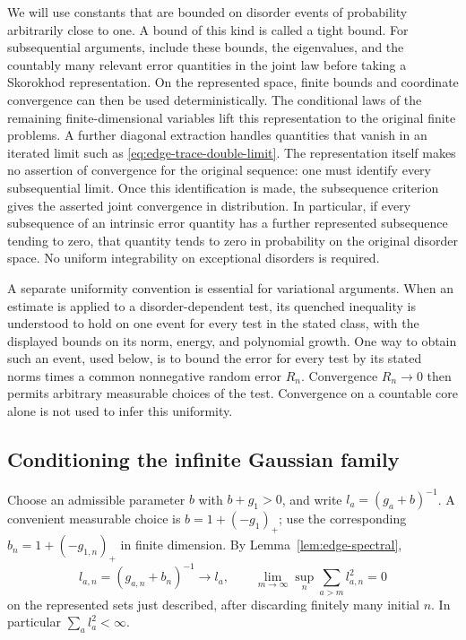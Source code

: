 \begin{remark}
\label{rem:edge-tight-convergence}
We will use constants that are bounded on disorder events of probability
arbitrarily close to one.  A bound of this kind is called a tight bound.
For subsequential arguments, include these bounds, the eigenvalues, and the
countably many relevant error quantities in the joint law before taking a
Skorokhod representation.  On the represented space, finite bounds and
coordinate convergence can then be used deterministically.  The conditional
laws of the remaining finite-dimensional variables lift this representation
to the original finite problems.  A further diagonal extraction handles
quantities that vanish in an iterated limit such as
\eqref{eq:edge-trace-double-limit}.  The representation itself makes no assertion of convergence for the
original sequence: one must identify every subsequential limit.  Once this
identification is made, the subsequence criterion gives the asserted joint
convergence in distribution.  In particular, if every subsequence of an
intrinsic error quantity has a further represented subsequence tending to
zero, that quantity tends to zero in probability on the original disorder
space.  No uniform integrability on exceptional disorders is required.

A separate uniformity convention is essential for variational arguments.
When an estimate is applied to a disorder-dependent test, its quenched
inequality is understood to hold on one event for every test in the stated
class, with the displayed bounds on its norm, energy, and polynomial growth.
One way to obtain such an event, used below, is to bound the error for every
test by its stated norms times a common nonnegative random error $R_n$.
Convergence $R_n\to0$ then permits arbitrary measurable choices of the test.
Convergence on a countable core alone is not used to infer this uniformity.
\end{remark}

\subsection{Conditioning the infinite Gaussian family}

Choose an admissible parameter $b$ with $b+g_1>0$, and write
$l_a=(g_a+b)^{-1}$.  A convenient measurable choice is
$b=1+(-g_1)_+$; use the corresponding $b_n=1+(-g_{1,n})_+$ in finite
dimension.  By Lemma~\ref{lem:edge-spectral},
\[
 l_{a,n}=(g_{a,n}+b_n)^{-1}\longrightarrow l_a,
 \qquad
 \lim_{m\to\infty}\sup_n\sum_{a>m}l_{a,n}^2=0
\]
on the represented sets just described, after discarding finitely many
initial $n$.  In particular $\sum_a l_a^2<\infty$.

